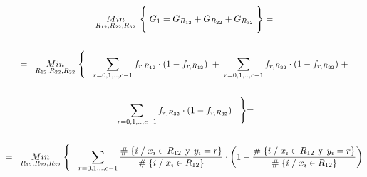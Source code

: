 \documentclass[
  11pt,
  a4paper,
]{article}
\begin{document}
\begin{gather*}
\underset{R_{12}  ,  R_{22}, R_{32}}  {Min} \hspace{0.15cm} \Biggl\{  \hspace{0.1cm} G_1 = G_{R_{12}} + G_{R_{22}} +  G_{R_{32}}  \hspace{0.1cm} \Biggl\}    \hspace{0.1cm} =   \\ \\ 
=\hspace{0.2cm} \underset{R_{12}  ,  R_{22}, R_{32}}  {Min} \hspace{0.1cm} \Biggl\{ \hspace{0.3cm}  \sum_{r=0,1,..,c-1}^{} f_{r , R_{12}}\cdot(1 - f_{r , R_{12}})  \hspace{0.1cm} + \hspace{0.1cm}  \sum_{r=0,1,..,c-1}^{} f_{r , R_{22}}\cdot(1 - f_{r , R_{22}}) \hspace{0.1cm} + \\ \\
\hspace{0.1cm}  \sum_{r=0,1,..,c-1}^{} f_{r , R_{32}}\cdot(1 - f_{r , R_{32}})  \hspace{0.3cm} \Biggl\} =     \\ \\
=\hspace{0.2cm}   \underset{R_{12}  ,  R_{22}  ,  R_{32}}  {Min} \hspace{0.1cm} \Biggl\{ \hspace{0.3cm}   \sum_{r=0,1,..,c-1}^{}  \dfrac{\# \hspace{0.1 cm}\lbrace i \hspace{0.1 cm}/\hspace{0.1 cm} x_i \in R_{12} \hspace{0.15 cm}\text{y}\hspace{0.15 cm} y_i = r  \rbrace}{\# \hspace{0.1 cm}\lbrace i \hspace{0.1 cm}/\hspace{0.1 cm} x_i \in R_{12}  \rbrace}  \cdot \left(   1 - \dfrac{\# \hspace{0.1 cm}\lbrace i \hspace{0.1 cm}/\hspace{0.1 cm} x_i \in R_{12} \hspace{0.15 cm}\text{y}\hspace{0.15 cm} y_i = r  \rbrace}{\# \hspace{0.1 cm}\lbrace i \hspace{0.1 cm}/\hspace{0.1 cm} x_i \in R_{12}  \rbrace}  \right)  \\ \\ 

\end{gather*}
\end{document}
